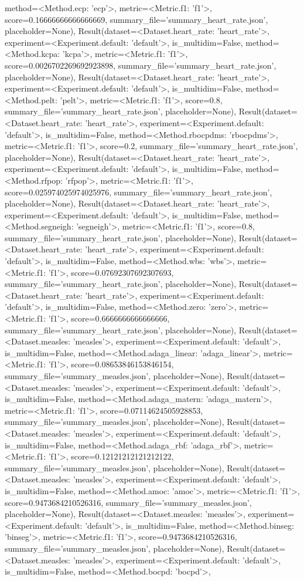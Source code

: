 method=<Method.ecp: 'ecp'>, metric=<Metric.f1: 'f1'>, score=0.16666666666666669, summary_file='summary_heart_rate.json', placeholder=None), Result(dataset=<Dataset.heart_rate: 'heart_rate'>, experiment=<Experiment.default: 'default'>, is_multidim=False, method=<Method.kcpa: 'kcpa'>, metric=<Metric.f1: 'f1'>, score=0.0026702269692923898, summary_file='summary_heart_rate.json', placeholder=None), Result(dataset=<Dataset.heart_rate: 'heart_rate'>, experiment=<Experiment.default: 'default'>, is_multidim=False, method=<Method.pelt: 'pelt'>, metric=<Metric.f1: 'f1'>, score=0.8, summary_file='summary_heart_rate.json', placeholder=None), Result(dataset=<Dataset.heart_rate: 'heart_rate'>, experiment=<Experiment.default: 'default'>, is_multidim=False, method=<Method.rbocpdms: 'rbocpdms'>, metric=<Metric.f1: 'f1'>, score=0.2, summary_file='summary_heart_rate.json', placeholder=None), Result(dataset=<Dataset.heart_rate: 'heart_rate'>, experiment=<Experiment.default: 'default'>, is_multidim=False, method=<Method.rfpop: 'rfpop'>, metric=<Metric.f1: 'f1'>, score=0.025974025974025976, summary_file='summary_heart_rate.json', placeholder=None), Result(dataset=<Dataset.heart_rate: 'heart_rate'>, experiment=<Experiment.default: 'default'>, is_multidim=False, method=<Method.segneigh: 'segneigh'>, metric=<Metric.f1: 'f1'>, score=0.8, summary_file='summary_heart_rate.json', placeholder=None), Result(dataset=<Dataset.heart_rate: 'heart_rate'>, experiment=<Experiment.default: 'default'>, is_multidim=False, method=<Method.wbs: 'wbs'>, metric=<Metric.f1: 'f1'>, score=0.07692307692307693, summary_file='summary_heart_rate.json', placeholder=None), Result(dataset=<Dataset.heart_rate: 'heart_rate'>, experiment=<Experiment.default: 'default'>, is_multidim=False, method=<Method.zero: 'zero'>, metric=<Metric.f1: 'f1'>, score=0.6666666666666666, summary_file='summary_heart_rate.json', placeholder=None), Result(dataset=<Dataset.measles: 'measles'>, experiment=<Experiment.default: 'default'>, is_multidim=False, method=<Method.adaga_linear: 'adaga_linear'>, metric=<Metric.f1: 'f1'>, score=0.08653846153846154, summary_file='summary_measles.json', placeholder=None), Result(dataset=<Dataset.measles: 'measles'>, experiment=<Experiment.default: 'default'>, is_multidim=False, method=<Method.adaga_matern: 'adaga_matern'>, metric=<Metric.f1: 'f1'>, score=0.07114624505928853, summary_file='summary_measles.json', placeholder=None), Result(dataset=<Dataset.measles: 'measles'>, experiment=<Experiment.default: 'default'>, is_multidim=False, method=<Method.adaga_rbf: 'adaga_rbf'>, metric=<Metric.f1: 'f1'>, score=0.12121212121212122, summary_file='summary_measles.json', placeholder=None), Result(dataset=<Dataset.measles: 'measles'>, experiment=<Experiment.default: 'default'>, is_multidim=False, method=<Method.amoc: 'amoc'>, metric=<Metric.f1: 'f1'>, score=0.9473684210526316, summary_file='summary_measles.json', placeholder=None), Result(dataset=<Dataset.measles: 'measles'>, experiment=<Experiment.default: 'default'>, is_multidim=False, method=<Method.binseg: 'binseg'>, metric=<Metric.f1: 'f1'>, score=0.9473684210526316, summary_file='summary_measles.json', placeholder=None), Result(dataset=<Dataset.measles: 'measles'>, experiment=<Experiment.default: 'default'>, is_multidim=False, method=<Method.bocpd: 'bocpd'>, 